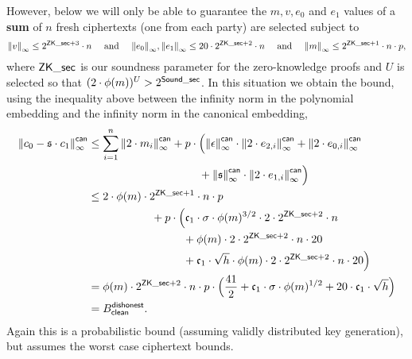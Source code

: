 \noindent
However, below we will only be able to guarantee the
$m, v, e_0$ and $e_1$ values of a {\bf sum} of $n$ fresh ciphertexts
(one from each party) are selected subject to
\[ {\Vert v \Vert}_\infty \le 2^{\mathsf{ZK\_sec} + 3} \cdot n \quad 
    \mbox{  and  } \quad
   {\Vert e_0 \Vert}_\infty, {\Vert e_1 \Vert}_\infty \le 20 \cdot 2^{\mathsf{ZK\_sec} + 2} \cdot n \quad
    \mbox{  and  } \quad
   {\Vert m \Vert}_\infty \le 2^{\mathsf{ZK\_sec} + 1} \cdot n \cdot p,
\]
where $\mathsf{ZK\_sec}$ is our soundness parameter for the 
zero-knowledge proofs
and $U$ is selected so that $(2 \cdot \phi(m))^U > 2^{\mathsf{Sound\_sec}}$.
In this situation we obtain the bound, using the inequality above
between the infinity norm in the polynomial embedding
and the infinity norm in the canonical embedding,
\begin{align*}
  \norm{c_0 - \sk \cdot c_1}_\infty^\can
  &\le \sum_{i=1}^n
  	\norm{2 \cdot m_i}_\infty^\can
	+ p \cdot \Big(\norm{\epsilon}_\infty^\can \cdot \norm{2 \cdot e_{2,i}}_\infty^\can 
	+ \norm{2 \cdot e_{0,i}}_\infty^\can \\
  &\hspace{3.5cm}
	+ \norm{\sk}_\infty^\can \cdot \norm{2 \cdot e_{1,i}}_\infty^\can \Big) \\
   &\le 2 \cdot \phi(m) \cdot 2^{\ZKsecp+1} \cdot n \cdot p  \\
   & \hspace{2cm}
	+ p \cdot \Big(
	 \gc_1 \cdot \sigma \cdot \phi(m)^{3/2} \cdot 2 \cdot 2^{\ZKsecp+2} \cdot n\\
  &\hspace{3cm}
	  + \phi(m) \cdot 2 \cdot  2^{\ZKsecp+2} \cdot n \cdot 20  \\
  &\hspace{3cm}
	  +  \gc_1 \cdot \sqrt{h} \cdot \phi(m) \cdot 2 \cdot 2^{\ZKsecp+2} \cdot n \cdot 20 
	\Big)  \\
  &=\phi(m) \cdot 2^{\ZKsecp+2} \cdot n \cdot p
	\cdot \Big( \frac{41}{2} + \gc_1 \cdot \sigma \cdot \phi(m)^{1/2}  
	           +  20 \cdot \gc_1 \cdot \sqrt{h} 
	\Big)   \\
  & = B_\clean^\dishonest.
\end{align*}
Again this is a probabilistic bound (assuming validly
distributed key generation), but assumes the worst case
ciphertext bounds.

